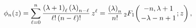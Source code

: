 \[\phi_{n}(z)=\sum_{\ell=0}^{n}\frac{\left(\lambda+1\right)_{\ell}\left(\lambda%
\right)_{n-\ell}}{\ell!\,(n-\ell)!}\,z^{\ell}=\frac{\left(\lambda\right)_{n}}{%
n!}\mathop{{{}_{2}F_{1}}\/}\nolimits\!\left({-n,\lambda+1\atop-\lambda-n+1};z%
\right),\]